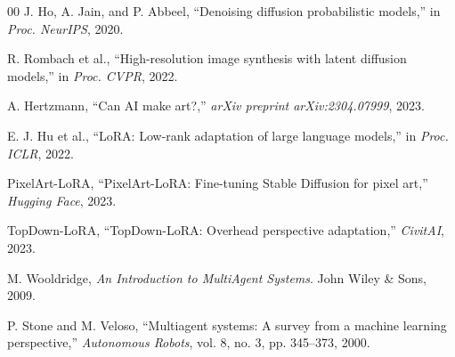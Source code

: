 \documentclass[conference]{IEEEtran}
\begin{document}
\begin{thebibliography}{00}
 J. Ho, A. Jain, and P. Abbeel, ``Denoising diffusion probabilistic models,'' in \emph{Proc. NeurIPS}, 2020.

 R. Rombach et al., ``High-resolution image synthesis with latent diffusion models,'' in \emph{Proc. CVPR}, 2022.

 A. Hertzmann, ``Can AI make art?,'' \emph{arXiv preprint arXiv:2304.07999}, 2023.

 E. J. Hu et al., ``LoRA: Low-rank adaptation of large language models,'' in \emph{Proc. ICLR}, 2022.

 PixelArt-LoRA, ``PixelArt-LoRA: Fine-tuning Stable Diffusion for pixel art,'' \emph{Hugging Face}, 2023.

 TopDown-LoRA, ``TopDown-LoRA: Overhead perspective adaptation,'' \emph{CivitAI}, 2023.

 M. Wooldridge, \emph{An Introduction to MultiAgent Systems}. John Wiley \& Sons, 2009.

 P. Stone and M. Veloso, ``Multiagent systems: A survey from a machine learning perspective,'' \emph{Autonomous Robots}, vol. 8, no. 3, pp. 345--373, 2000.

\end{thebibliography}
\end{document}
